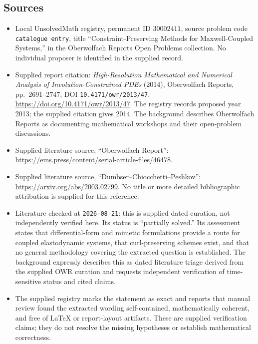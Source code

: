 \documentclass[11pt]{article}
\begin{document}
\subsection{Sources}
\begin{itemize}
\item Local UnsolvedMath registry, permanent ID \(30002411\), source problem code \texttt{catalogue entry}, title ``Constraint-Preserving Methods for Maxwell-Coupled Systems,'' in the Oberwolfach Reports Open Problems collection. No individual proposer is identified in the supplied record.
\item Supplied report citation: \emph{High-Resolution Mathematical and Numerical Analysis of Involution-Constrained PDEs} (2014), Oberwolfach Reports, pp.\ 2691--2747, DOI \texttt{10.4171/owr/2013/47}. \url{https://doi.org/10.4171/owr/2013/47}. The registry records proposed year 2013; the supplied citation gives 2014. The background describes Oberwolfach Reports as documenting mathematical workshops and their open-problem discussions.
\item Supplied literature source, ``Oberwolfach Report'': \url{https://ems.press/content/serial-article-files/46478}.
\item Supplied literature source, ``Dumbser--Chiocchetti--Peshkov'': \url{https://arxiv.org/abs/2003.02799}. No title or more detailed bibliographic attribution is supplied for this reference.
\item Literature checked at \texttt{2026-08-21}: this is supplied dated curation, not independently verified here. Its status is ``partially solved.'' Its assessment states that differential-form and mimetic formulations provide a route for coupled elastodynamic systems, that curl-preserving schemes exist, and that no general methodology covering the extracted question is established. The background expressly describes this as dated literature triage derived from the supplied OWR curation and requests independent verification of time-sensitive status and cited claims.
\item The supplied registry marks the statement as exact and reports that manual review found the extracted wording self-contained, mathematically coherent, and free of LaTeX or report-layout artifacts. These are supplied verification claims; they do not resolve the missing hypotheses or establish mathematical correctness.
\end{itemize}
\end{document}
